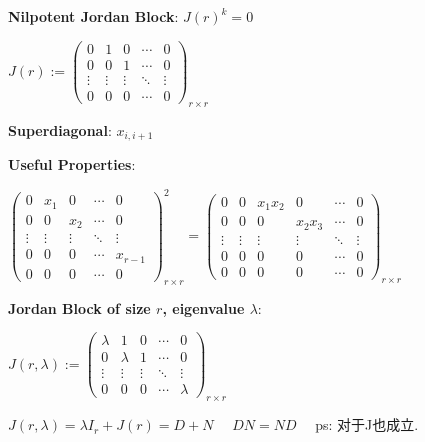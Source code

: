 \documentclass[9pt]{article}
\begin{document}
\begin{minipage}[t]{0.23\textwidth}
    
{\footnotesize \textbf{Nilpotent Jordan Block}: $J(r)^k=0$}

{\tiny $J(r):=\begin{pmatrix} 0 & 1 & 0 & \cdots & 0 \\ 0 & 0 & 1 & \cdots & 0 \\ \vdots & \vdots & \vdots & \ddots & \vdots \\ 0 & 0 & 0 & \cdots & 0 \end{pmatrix}_{r\times r}$}

{\footnotesize \textbf{Superdiagonal}: $x_{i,i+1}$ }

\end{minipage}
\hfill
\vrule width 0.3pt
\hfill
\begin{minipage}[t]{0.37\textwidth}

{\footnotesize \textbf{Useful Properties}:}

{\tiny $\begin{pmatrix} 0 & x_1 & 0 & \cdots & 0 \\ 0 & 0 & x_2 & \cdots & 0 \\ \vdots & \vdots & \vdots & \ddots & \vdots \\ 0 & 0 & 0 & \cdots & x_{r-1} \\ 0 & 0 & 0 & \cdots & 0 \end{pmatrix}_{r\times r}^2=\begin{pmatrix} 0 & 0 & x_1x_2 & 0 & \cdots & 0 \\ 0 & 0 & 0 & x_2x_3 & \cdots & 0 \\ \vdots & \vdots & \vdots & \vdots & \ddots & \vdots \\ 0 & 0 & 0 & 0 & \cdots & 0 \\ 0 & 0 & 0 & 0 & \cdots & 0 \end{pmatrix}_{r\times r}$}

\end{minipage}
\hfill
\vrule width 0.3pt
\hfill
\begin{minipage}[t]{0.28\textwidth}

{\footnotesize \textbf{Jordan Block of size $r$, eigenvalue $\lambda$}:}

{\tiny $J(r,\lambda):=\begin{pmatrix} \lambda & 1 & 0 & \cdots & 0 \\ 0 & \lambda & 1 & \cdots & 0 \\ \vdots & \vdots & \vdots & \ddots & \vdots \\ 0 & 0 & 0 & \cdots & \lambda \end{pmatrix}_{r\times r}$}

{\tiny $J(r,\lambda)=\lambda I_r+J(r)=D+N$ \ \ $DN=ND$ \ \ ps: 对于J也成立.}

\end{minipage}
\end{document}
